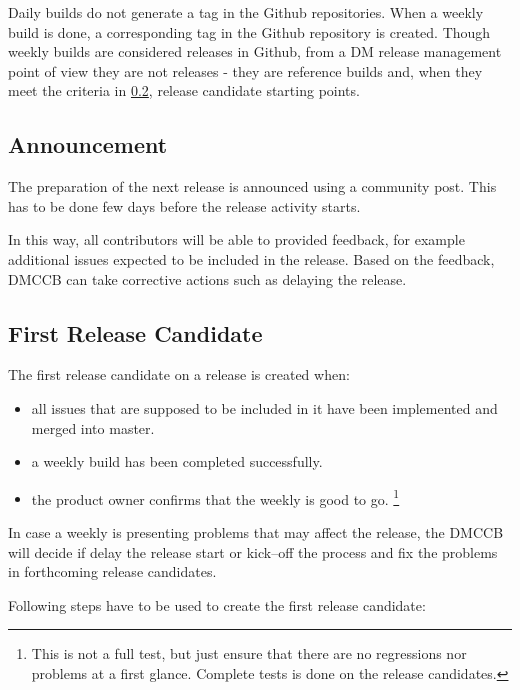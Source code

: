 Daily builds do not generate a tag in the Github repositories.
When a weekly build is done, a corresponding tag in the Github repository is created.
Though weekly builds are considered releases in Github, from a DM release management point of view they are not
releases - they are reference builds and, when they meet the criteria in \ref{sec:firstrc}, release candidate starting points.


\subsection{Announcement} \label{sec:anaouncement}

The preparation of the next release is announced using a community post.
This has to be done few days before the release activity starts.

In this way, all contributors will be able to provided feedback, for example additional issues expected to be included in the release.
Based on the feedback, DMCCB can take corrective actions such as delaying the release.


\subsection{First Release Candidate} \label{sec:firstrc}

The first release candidate on a release is created when:

\begin{itemize}
\item all issues that are supposed to be included in it have been implemented and merged into master.
\item a weekly build has been completed successfully.
\item the product owner confirms that the weekly is good to go. \footnote{This is not a full test, but just ensure that there are no regressions nor problems at a first glance. Complete tests is done on the release candidates.}
\end{itemize}

In case a weekly is presenting problems that may affect the release, the DMCCB will decide if delay the release start or kick--off the process and fix the problems in forthcoming release candidates.


Following steps have to be used to create the first release candidate:

